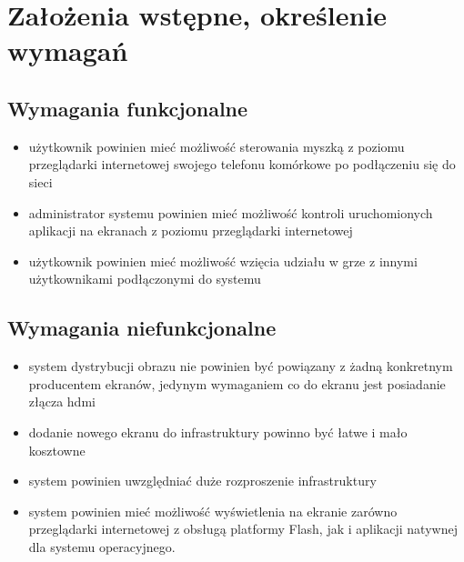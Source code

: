 \section{Założenia wstępne, określenie wymagań}

\subsection{Wymagania funkcjonalne}

\begin{itemize}
	\item użytkownik powinien mieć możliwość sterowania myszką z poziomu przeglądarki internetowej swojego telefonu komórkowe po podłączeniu się do sieci
	\item administrator systemu powinien mieć możliwość kontroli uruchomionych aplikacji na ekranach z poziomu przeglądarki internetowej
	\item użytkownik powinien mieć możliwość wzięcia udziału w grze z innymi użytkownikami podłączonymi do systemu
\end{itemize}


\subsection{Wymagania niefunkcjonalne}
\begin{itemize}
	\item system dystrybucji obrazu nie powinien być powiązany z żadną konkretnym producentem ekranów, jedynym wymaganiem co do ekranu jest posiadanie złącza hdmi
	\item dodanie nowego ekranu do infrastruktury powinno być łatwe i mało kosztowne
	\item system powinien uwzględniać duże rozproszenie infrastruktury 
	\item system powinien mieć możliwość wyświetlenia na ekranie zarówno przeglądarki internetowej z obsługą platformy Flash, jak i aplikacji natywnej dla systemu operacyjnego.
\end{itemize}
